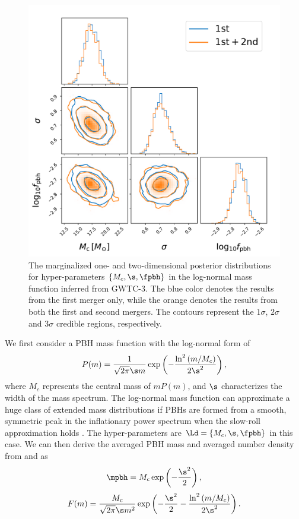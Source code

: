 \documentclass[
reprint,           %
superscriptaddress,%
amsmath,           %
amssymb,           %
aps,               %
prd,               %
notitlepage,       %
longbibliography,  %
floatfix,          %
nofootinbib,
]{revtex4-1}
\def\({\left(}
\def\){\right)}
\def\e{\begin{equation}}
\def\q{\end{equation}}
\begin{document}
\begin{figure}[tbp!]
	\centering
	\includegraphics[width=\linewidth]{post-log.pdf}
	\caption{\label{posterior-log}The marginalized one- and two-dimensional posterior distributions for hyper-parameters $\{M_c, \s, \fpbh\}$ in the log-normal mass function inferred from GWTC-3. The blue color denotes the results from the first merger only, while the orange denotes the results from both the first and second mergers. The contours represent the $1\sigma$, $2\sigma$ and $3\sigma$ credible regions, respectively.}
\end{figure}

We first consider a PBH mass function with the log-normal form \cite{Dolgov:1992pu} of
\e\label{log}
P(m) = \frac{1}{\sqrt{2\pi} \s m} \exp \(-\frac{\ln^2\(m/M_c\)}{2\s^2}\),
\q
where $M_c$ represents the central mass of $m P(m)$, and $\s$ characterizes the width of the mass spectrum.
The log-normal mass function can approximate a huge class of extended mass distributions if PBHs are formed from a smooth, symmetric peak in the inflationary power spectrum when the slow-roll approximation holds \cite{Green:2016xgy,Carr:2017jsz,Kannike:2017bxn}.
The hyper-parameters are $\Ld = \{M_c, \s, \fpbh\}$ in this case. 
We can then derive the averaged PBH mass and averaged number density from  and  as
\e
\mpbh = M_c \exp \(-\frac{\s^2}{2}\),
\q
\e 
F(m) = \frac{M_c}{\sqrt{2\pi} \s m^2} \exp \(-\frac{\s^2}{2}-\frac{\ln^2\(m/M_c\)}{2\s^2}\).
\q
\end{document}
